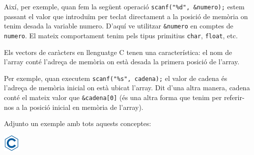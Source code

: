 \documentclass[]{book}
\begin{document}
Així, per exemple, quan fem la següent operació \texttt{scanf("\%d",\ \&numero);} estem passant el valor que introduïm per teclat directament a la posició de memòria on tenim desada la variable numero. D'aquí ve utilitzar \texttt{\&numero} en comptes de \texttt{numero}. El mateix comportament tenim pels tipus primitius \texttt{char}, \texttt{float}, etc.

Els vectors de caràcters en llenguatge C tenen una característica: el nom de l'array conté l'adreça de memòria on està desada la primera posició de l'array.

Per exemple, quan executem \texttt{scanf("\%s",\ cadena);} el valor de cadena és l'adreça de memòria inicial on està ubicat l'array. Dit d'una altra manera, cadena conté el mateix valor que \texttt{\&cadena{[}0{]}} (és una altra forma que tenim per referir-nos a la posició inicial en memòria de l'array).

Adjunto un exemple amb tots aquests conceptes:

\includegraphics{./img/c.png}
\end{document}
